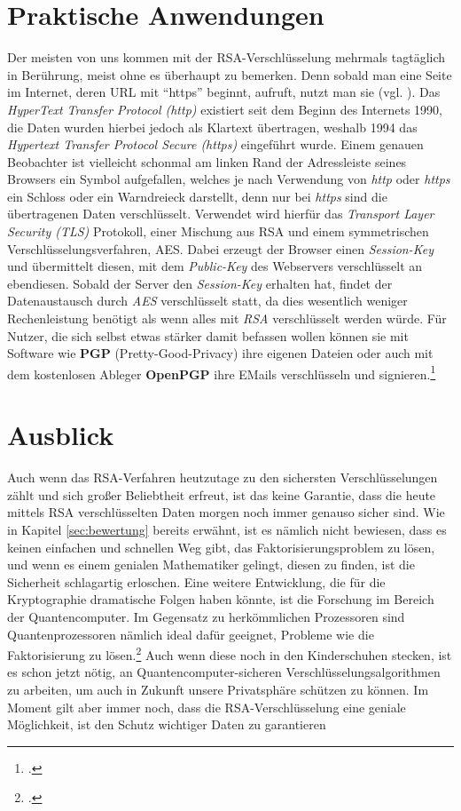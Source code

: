 \documentclass{scrarticle}
\begin{document}
    \section{Praktische Anwendungen}
        Der meisten von uns kommen mit der RSA-Verschlüsselung mehrmals tagtäglich in Berührung, meist ohne es überhaupt zu bemerken. Denn sobald man eine Seite im Internet, deren URL mit \enquote{https} beginnt, aufruft, nutzt man sie (vgl. \cite{httpsblog}). Das \emph{HyperText Transfer Protocol (http)} existiert seit dem Beginn des Internets 1990, die Daten wurden hierbei jedoch als Klartext übertragen, weshalb 1994 das \emph{Hypertext Transfer Protocol Secure (https)} eingeführt wurde. Einem genauen Beobachter ist vielleicht schonmal am linken Rand der Adressleiste seines Browsers ein Symbol aufgefallen, welches je nach Verwendung von \emph{http} oder \emph{https} ein Schloss oder ein Warndreieck darstellt, denn nur bei \emph{https} sind die übertragenen Daten verschlüsselt. Verwendet wird hierfür das \emph{Transport Layer Security (TLS)} Protokoll, einer Mischung aus RSA und einem symmetrischen Verschlüsselungsverfahren, AES. Dabei erzeugt der Browser einen \emph{Session-Key} und übermittelt diesen, mit dem \emph{Public-Key} des Webservers verschlüsselt an ebendiesen. Sobald der Server den \emph{Session-Key} erhalten hat, findet der Datenaustausch durch \emph{AES} verschlüsselt statt, da dies wesentlich weniger Rechenleistung benötigt als wenn alles mit \emph{RSA} verschlüsselt werden würde.
        Für Nutzer, die sich selbst etwas stärker damit befassen wollen können sie mit Software wie \textbf{PGP} (Pretty-Good-Privacy) ihre eigenen Dateien oder auch mit dem kostenlosen Ableger \textbf{OpenPGP} ihre EMails verschlüsseln und signieren.\footcite[vgl.][]{zotero-48}
        
    \section{Ausblick}
        Auch wenn das RSA-Verfahren heutzutage zu den sichersten Verschlüsselungen zählt und sich großer Beliebtheit erfreut, ist das keine Garantie, dass die heute mittels RSA verschlüsselten Daten morgen noch immer genauso sicher sind. Wie in Kapitel \ref{sec:bewertung} bereits erwähnt, ist es nämlich nicht bewiesen, dass es keinen einfachen und schnellen Weg gibt, das Faktorisierungsproblem zu lösen, und wenn es einem genialen Mathematiker gelingt, diesen zu finden, ist die Sicherheit schlagartig erloschen. Eine weitere Entwicklung, die für die Kryptographie dramatische Folgen haben könnte, ist die Forschung im Bereich der Quantencomputer. Im Gegensatz zu herkömmlichen Prozessoren sind Quantenprozessoren nämlich ideal dafür geeignet, Probleme wie die Faktorisierung zu lösen.\footcite[vgl.][]{wiedmann} Auch wenn diese noch in den Kinderschuhen stecken, ist es schon jetzt nötig, an Quantencomputer-sicheren Verschlüsselungsalgorithmen zu arbeiten, um auch in Zukunft unsere Privatsphäre schützen zu können. Im Moment gilt aber immer noch, dass die RSA-Verschlüsselung eine geniale Möglichkeit, ist den Schutz wichtiger Daten zu garantieren

    \newpage
    \printbibliography
    \newpage
    
\end{document}
